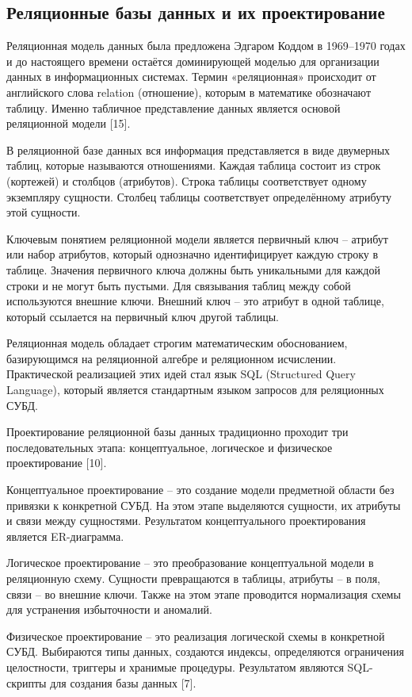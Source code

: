 \documentclass[14pt,a4paper]{extarticle}
\begin{document}
\subsection{Реляционные базы данных и их проектирование}

Реляционная модель данных была предложена Эдгаром Коддом в 1969--1970
годах и до настоящего времени остаётся доминирующей моделью для
организации данных в информационных системах. Термин «реляционная»
происходит от английского слова relation (отношение), которым в
математике обозначают таблицу. Именно табличное представление данных
является основой реляционной модели [15].

В реляционной базе данных вся информация представляется в виде двумерных
таблиц, которые называются отношениями. Каждая таблица состоит из строк
(кортежей) и столбцов (атрибутов). Строка таблицы соответствует одному
экземпляру сущности. Столбец таблицы соответствует определённому
атрибуту этой сущности.

Ключевым понятием реляционной модели является первичный ключ -- атрибут
или набор атрибутов, который однозначно идентифицирует каждую строку в
таблице. Значения первичного ключа должны быть уникальными для каждой
строки и не могут быть пустыми. Для связывания таблиц между собой
используются внешние ключи. Внешний ключ -- это атрибут в одной таблице,
который ссылается на первичный ключ другой таблицы.

Реляционная модель обладает строгим математическим обоснованием,
базирующимся на реляционной алгебре и реляционном исчислении.
Практической реализацией этих идей стал язык SQL (Structured Query
Language), который является стандартным языком запросов для реляционных
СУБД.

Проектирование реляционной базы данных традиционно проходит три
последовательных этапа: концептуальное, логическое и физическое
проектирование [10].

Концептуальное проектирование -- это создание модели предметной области
без привязки к конкретной СУБД. На этом этапе выделяются сущности, их
атрибуты и связи между сущностями. Результатом концептуального
проектирования является ER-диаграмма.

Логическое проектирование -- это преобразование концептуальной модели в
реляционную схему. Сущности превращаются в таблицы, атрибуты -- в поля,
связи -- во внешние ключи. Также на этом этапе проводится нормализация
схемы для устранения избыточности и аномалий.

Физическое проектирование -- это реализация логической схемы в
конкретной СУБД. Выбираются типы данных, создаются индексы, определяются
ограничения целостности, триггеры и хранимые процедуры. Результатом
являются SQL-скрипты для создания базы данных [7].
\end{document}
